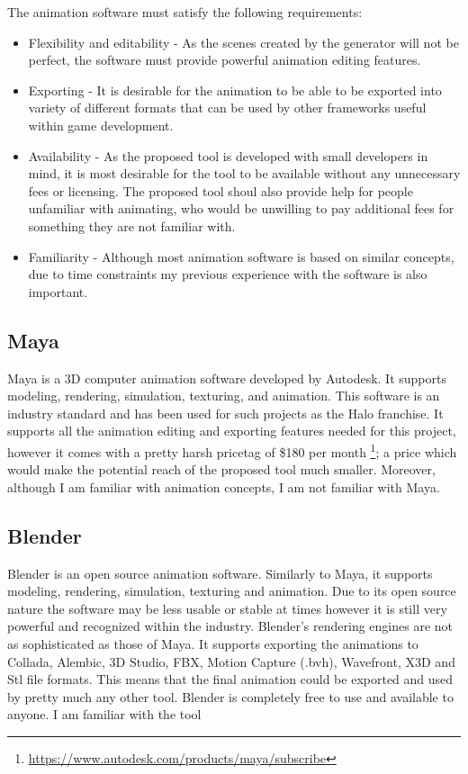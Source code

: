 The animation software must satisfy the following requirements:
\begin{itemize}
\item Flexibility and editability - As the scenes created by the generator will not be perfect, the software must provide powerful animation editing features.
\item Exporting - It is desirable for the animation to be able to be exported into variety of different formats that can be used by other frameworks useful within game development.
\item Availability - As the proposed tool is developed with small developers in mind, it is most desirable for the tool to be available without any unnecessary fees or licensing. The proposed tool shoul also provide help for people unfamiliar with animating, who would be unwilling to pay additional fees for something they are not familiar with.
\item Familiarity - Although most animation software is based on similar concepts, due to time constraints my previous experience with the software is also important.
\end{itemize}


\subsection{Maya}
Maya is a 3D computer animation software developed by Autodesk. It supports modeling, rendering, simulation, texturing, and animation. This software is an industry standard and has been used for such projects as the Halo franchise. It supports all the animation editing and exporting features needed for this project, however it comes with a pretty harsh pricetag of \$180 per month \footnote{\url{https://www.autodesk.com/products/maya/subscribe}}; a price which would make the potential reach of the proposed tool much smaller. Moreover, although I am familiar with animation concepts, I am not familiar with Maya.


\subsection{Blender}
Blender is an open source animation software. Similarly to Maya, it supports modeling, rendering, simulation, texturing and animation. Due to its open source nature the software may be less usable or stable at times however it is still very powerful and recognized within the industry. Blender's rendering engines are not as sophisticated as those of Maya. It supports exporting the animations to Collada, Alembic, 3D Studio, FBX, Motion Capture (.bvh), Wavefront, X3D and Stl file formats. This means that the final animation could be exported and used by pretty much any other tool. Blender is completely free to use and available to anyone. I am familiar with the tool


